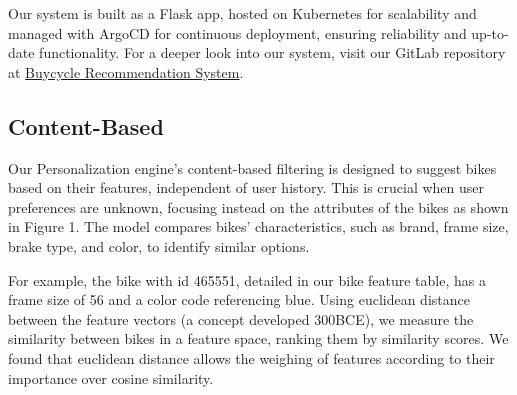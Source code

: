 \documentclass{article}
\begin{document}
Our system is built as a Flask app, hosted on Kubernetes for scalability and managed with ArgoCD for continuous deployment, ensuring reliability and up-to-date functionality. For a deeper look into our system, visit our GitLab repository at \href{https://gitlab.com/buycycle/recommendation_content}{Buycycle Recommendation System}.

\subsection*{Content-Based}
Our Personalization engine's content-based filtering is designed to suggest bikes based on their features, independent of user history. This is crucial when user preferences are unknown, focusing instead on the attributes of the bikes as shown in Figure 1. The model compares bikes' characteristics, such as brand, frame size, brake type, and color, to identify similar options.

For example, the bike with id 465551, detailed in our bike feature table, has a frame size of 56 and a color code referencing blue. Using euclidean distance  between the feature vectors (a concept developed 300BCE), we measure the similarity between bikes in a feature space, ranking them by similarity scores. We found that euclidean distance allows the weighing of features according to their importance over cosine similarity.
\end{document}
